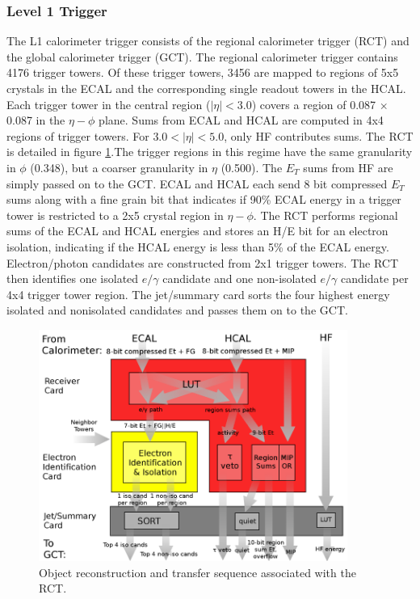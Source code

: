 \documentclass[oneside, letterpaper, oldfontcommands]{memoir}
\begin{document}
\subsubsection{Level 1 Trigger}\label{L1trig}

\qquad The L1 calorimeter trigger consists of the regional calorimeter trigger (RCT) and the global calorimeter trigger (GCT). The regional calorimeter trigger contains 4176 trigger towers. Of these trigger towers, 3456 are mapped to regions of 5x5 crystals in the ECAL and the corresponding single readout towers in the HCAL. Each trigger tower in the central region ($|\eta| < 3.0$) covers a region of 0.087 $\times$ 0.087 in the $\eta - \phi$ plane. Sums from ECAL and HCAL are computed in 4x4 regions of trigger towers. For $3.0 < |\eta| < 5.0$, only HF contributes sums. The RCT is detailed in figure \ref{fig:rct}.The trigger regions in this regime have the same granularity in $\phi$ (0.348), but a coarser granularity in $\eta$ (0.500). The $E_{T}$ sums from HF are simply passed on to the GCT. ECAL and HCAL each send 8 bit compressed $E_{T}$ sums along with a fine grain bit that indicates if 90\% ECAL energy in a trigger tower is restricted to a 2x5 crystal region in $\eta - \phi$. The RCT performs regional sums of the ECAL and HCAL energies and stores an H/E bit for an electron isolation, indicating if the HCAL energy is less than 5\% of the ECAL energy. Electron/photon candidates are constructed from 2x1 trigger towers. The RCT then identifies one isolated $e/\gamma$ candidate and one non-isolated $e/\gamma$ candidate per 4x4 trigger tower region. The jet/summary card sorts the four highest energy isolated and nonisolated candidates and passes them on to the GCT. 

\begin{figure}[here]
\includegraphics[width=0.9\textwidth]{rct.png}
\caption{Object reconstruction and transfer sequence associated with the RCT.}
\label{fig:rct}
\end{figure}
\end{document}
